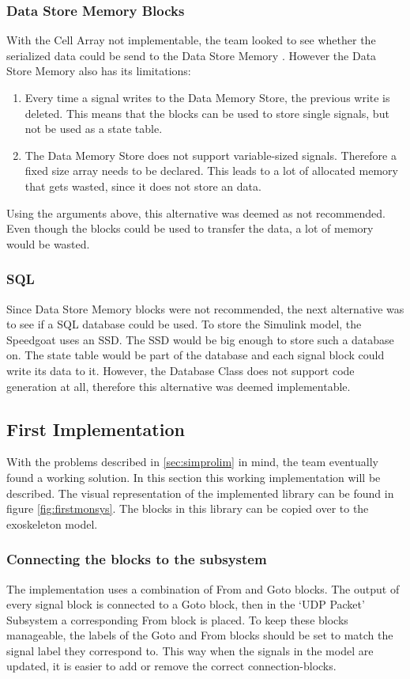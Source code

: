 \subsubsection{Data Store Memory Blocks}
With the Cell Array not implementable, the team looked to see whether the serialized data could be send to the Data Store Memory \cite{web:datastore}. However the Data Store Memory also has its limitations:
\begin{enumerate}
	\item Every time a signal writes to the Data Memory Store, the previous write is deleted. This means that the blocks can be used to store single signals, but not be used as a state table.
	\item The Data Memory Store does not support variable-sized signals. Therefore a fixed size array needs to be declared. This leads to a lot of allocated memory that gets wasted, since it does not store an data.
\end{enumerate}
Using the arguments above, this alternative was deemed as not recommended. Even though the blocks could be used to transfer the data, a lot of memory would be wasted.

\subsubsection{SQL}
Since Data Store Memory blocks were not recommended, the next alternative was to see if a SQL database could be used. To store the Simulink model, the Speedgoat uses an SSD. The SSD would be big enough to store such a database on. The state table would be part of the database and each signal block could write its data to it. However, the Database Class does not support code generation at all, therefore this alternative was deemed implementable.

\subsection{First Implementation}\label{sec:simfirim}
With the problems described in \ref{sec:simprolim} in mind, the team eventually found a working solution. In this section this working implementation will be described. The visual representation of the implemented library can be found in figure \ref{fig:firstmonsys}. The blocks in this library can be copied over to the exoskeleton model.

\subsubsection{Connecting the blocks to the subsystem}
The implementation uses a combination of From \cite{web:from} and Goto \cite{web:goto} blocks. The output of every signal block is connected to a Goto block, then in the `UDP Packet' Subsystem a corresponding From block is placed. To keep these blocks manageable, the labels of the Goto and From blocks should be set to match the signal label they correspond to. This way when the signals in the model are updated, it is easier to add or remove the correct connection-blocks.

